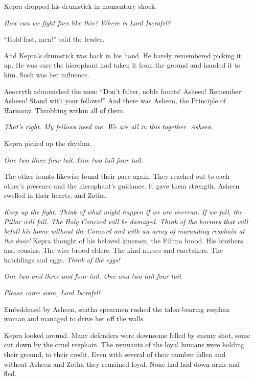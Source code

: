 \documentclass
  [a4paper,
   12pt,
   oneside
  ]%
  {article}
\newcommand{\drum}[1]{\textsl{#1}}
\begin{document}
Kepra dropped his drumstick in momentary shock. 

\emph{How can we fight foes like this? Where is Lord Iscrafel?}

``Hold fast, men!'' said the leader.

And Kepra's drumstick was back in his hand. He barely remembered picking it up. 
He was sure the hierophant had taken it from the ground and handed it to him. Such was her influence. 

Aeocryth admonished the men: ``Don’t falter, noble founts! Asheen! Remember Asheen! Stand with your fellows!''
And there was Asheen, the Principle of Harmony. Throbbing within all of them. 

\emph{That's right. My fellows need me. We are all in this together. Asheen.}

Kepra picked up the rhythm.

\drum{One two three four \emph{tail}. One two \emph{tail} four \emph{tail}.}

The other founts likewise found their pace again. 
They reached out to each other’s presence and the hierophant’s guidance. It gave them strength. Asheen swelled in their hearts, and Zotha.

\emph{
    Keep up the fight. Think of what might happen if we are overrun. If we fall, the Pillar will fall. The Holy Concord will be damaged. 
    Think of the horrors that will befall his home without the Concord and with an army of marauding resphain at the door!%
} 
Kepra thought of his beloved kinsmen, the Filima brood. His brothers and cousins. The wise brood elders. The kind nurses and caretakers. The hatchlings and eggs. 
\emph{Think of the eggs!}

\drum{One two-and-three-and-four \emph{tail}. One-and-two \emph{tail} four \emph{tail}.}

\emph{Please come soon, Lord Iscrafel!}

Emboldened by Asheen, scatha spearmen rushed the talon-bearing resphan woman and managed to drive her off the walls. 

Kepra looked around. Many defenders were down\dash{}some felled by enemy shot, some cut down by the cruel resphain. 
The remnants of the loyal humans were holding their ground, to their credit. 
Even with several of their number fallen and without Asheen and Zotha they remained loyal. None had laid down arms and fled. 
\end{document}
